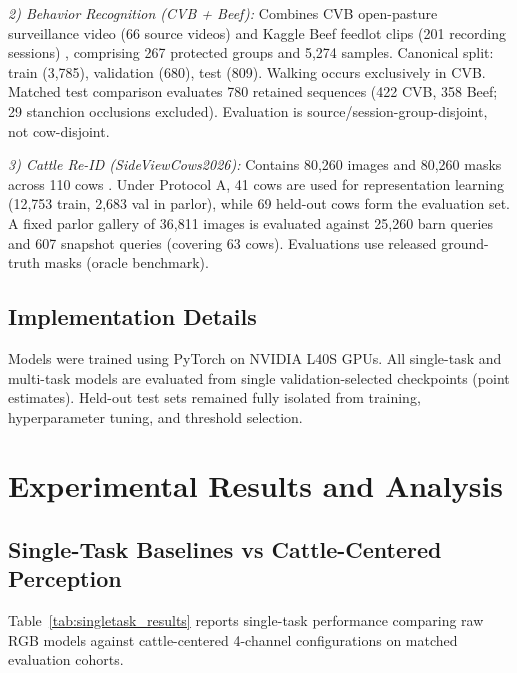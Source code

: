 \documentclass[conference]{IEEEtran}
\begin{document}
\textit{2) Behavior Recognition (CVB + Beef):} Combines CVB open-pasture surveillance video (66 source videos) \cite{zia2023cvb} and Kaggle Beef feedlot clips (201 recording sessions) \cite{lucyfirst2023beef}, comprising 267 protected groups and 5,274 samples. Canonical split: train (3,785), validation (680), test (809). Walking occurs exclusively in CVB. Matched test comparison evaluates 780 retained sequences (422 CVB, 358 Beef; 29 stanchion occlusions excluded). Evaluation is source/session-group-disjoint, not cow-disjoint.

\textit{3) Cattle Re-ID (SideViewCows2026):} Contains 80,260 images and 80,260 masks across 110 cows \cite{moeller2026sideview}. Under Protocol A, 41 cows are used for representation learning (12,753 train, 2,683 val in parlor), while 69 held-out cows form the evaluation set. A fixed parlor gallery of 36,811 images is evaluated against 25,260 barn queries and 607 snapshot queries (covering 63 cows). Evaluations use released ground-truth masks (oracle benchmark).

\subsection{Implementation Details}
Models were trained using PyTorch on NVIDIA L40S GPUs. All single-task and multi-task models are evaluated from single validation-selected checkpoints (point estimates). Held-out test sets remained fully isolated from training, hyperparameter tuning, and threshold selection.

\section{Experimental Results and Analysis}

\subsection{Single-Task Baselines vs Cattle-Centered Perception}
Table~\ref{tab:singletask_results} reports single-task performance comparing raw RGB models against cattle-centered 4-channel configurations on matched evaluation cohorts.
\end{document}

